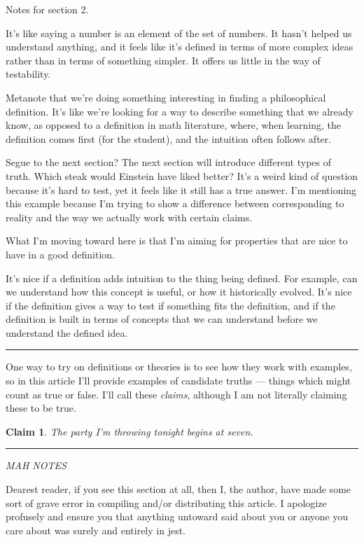 \documentclass[11pt, oneside]{article}   	%
\newtheorem{claim}{Claim}
\newcommand\hr{\bigskip\hrule\bigskip}
\begin{document}
Notes for section 2.

It's like saying a number is an element of the set of numbers.
It hasn't helped us understand anything, and it feels like it's
defined in terms of more complex ideas rather than in terms of
something simpler. It offers us little in the way of testability.

Metanote that we're doing something interesting in finding a philosophical
definition. It's like we're looking for a way to describe something that
we already know, as opposed to a definition in math literature, where, when
learning, the definition comes first (for the student), and the intuition often
follows after.

Segue to the next section? The next section will introduce different types of
truth. Which steak would Einstein have liked better? It's a weird kind of
question because it's hard to test, yet it feels like it still has a true
answer. I'm mentioning this example because I'm trying to show a difference
between corresponding to reality and the way we actually work with certain
claims.

What I'm moving toward here is that I'm aiming for properties that are nice to
have in a good definition.

It's nice if a definition adds intuition to the thing being defined. For
example, can we understand how this concept is useful, or how it historically
evolved. It's nice if the definition gives a way to test if something fits the
definition, and if the definition is built in terms of concepts that we can
understand before we understand the defined idea.

\hr


One way to try on definitions or theories is to see how they work with examples,
so in this article I'll provide examples of candidate truths --- things which
might count as true or false. I'll call these {\em claims}, although I am not
literally claiming these to be true.

\begin{claim}
    The party I'm throwing tonight begins at seven.
\end{claim}





\bigskip
\hrule
\bigskip

{\em MAH NOTES}

Dearest reader, if you see this section at all, then I, the author,
have made some sort of grave error in compiling and/or distributing this
article. I apologize profusely and ensure you that anything untoward said
about you or anyone you care about was surely and entirely in jest.
\end{document}
